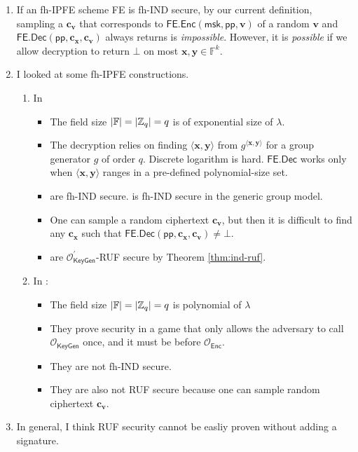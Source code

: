 \begin{enumerate}

\item If an fh-IPFE scheme \textsf{FE} is fh-IND secure, by our current definition, sampling a $\mathbf{c_v}$ that corresponds to $\textsf{FE.Enc}(\textsf{msk}, \textsf{pp}, \mathbf{v})$ of a random $\mathbf{v}$ and $\textsf{FE.Dec}(\textsf{pp}, \mathbf{c_x}, \mathbf{c_v})$ always returns is \emph{impossible}. However, it is \emph{possible} \cite{cryptoeprint:2015/1255, 10.1007/978-3-319-45871-7_24, cryptoeprint:2016/440} if we allow decryption to return $\bot$ on most $\mathbf{x}, \mathbf{y} \in \mathbb{F}^k$.
\item I looked at some fh-IPFE constructions.

\begin{enumerate}

	\item In \cite{cryptoeprint:2015/1255, 10.1007/978-3-319-45871-7_24, cryptoeprint:2016/440}
	\begin{itemize}
		\item The field size $|\mathbb{F}| = |\mathbb{Z}_q| = q$ is of exponential size of $\lambda$.
		\item The decryption relies on finding $\langle \mathbf{x}, \mathbf{y} \rangle$ from $g^{\langle \mathbf{x}, \mathbf{y} \rangle}$ for a group generator $g$ of order $q$. Discrete logarithm is hard. $\textsf{FE.Dec}$ works only when $\langle \mathbf{x}, \mathbf{y} \rangle$ ranges in a pre-defined polynomial-size set.
		\item \cite{cryptoeprint:2015/1255, 10.1007/978-3-319-45871-7_24} are fh-IND secure. \cite{cryptoeprint:2016/440} is fh-IND secure in the generic group model.
		\item One can sample a random ciphertext $\mathbf{c_v}$, but then it is difficult to find any $\mathbf{c_x}$ such that $\textsf{FE.Dec}(\textsf{pp}, \mathbf{c_x}, \mathbf{c_v}) \neq \bot$. 
		\item \cite{cryptoeprint:2015/1255, cryptoeprint:2016/440} are $\mathcal{O}_\textsf{KeyGen}^\prime$-RUF secure by Theorem \ref{thm:ind-ruf}.
	\end{itemize}

	\item In \cite{cryptoeprint:2018/1214, 10.1007/978-3-030-90567-5_33}:
	\begin{itemize}
		\item The field size $|\mathbb{F}| = |\mathbb{Z}_q| = q$ is polynomial of $\lambda$
		\item They prove security in a game that only allows the adversary to call $\mathcal{O}_\textsf{KeyGen}$ once, and it must be before $\mathcal{O}_\textsf{Enc}$.
		\item They are not fh-IND secure.
		\item They are also not RUF secure because one can sample random ciphertext $\mathbf{c_v}$.
	\end{itemize}
\end{enumerate}

\item In general, I think RUF security cannot be easliy proven without adding a signature.

\end{enumerate}
